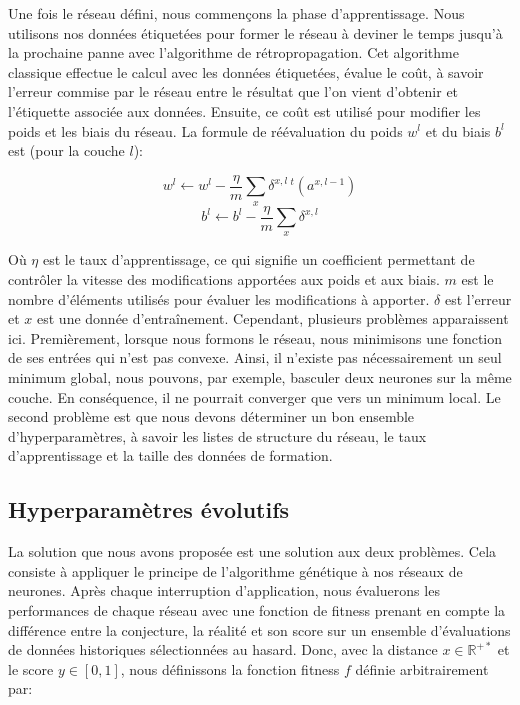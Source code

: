 \documentclass[10pt,a4paper,oneside]{article}
\begin{document}
\begin{multicols}{2}
Une fois le réseau défini, nous commençons la phase d’apprentissage. Nous utilisons nos données étiquetées pour former le réseau à deviner le temps jusqu'à la prochaine panne avec l'algorithme de rétropropagation. Cet algorithme classique effectue le calcul avec les données étiquetées, évalue le coût, à savoir l'erreur commise par le réseau entre le résultat que l'on vient d'obtenir et l'étiquette associée aux données. Ensuite, ce coût est utilisé pour modifier les poids et les biais du réseau. La formule de réévaluation du poids $w^l$ et du biais $b^l$ est (pour la couche $l$):

\vspace{0.8cm}

\begin{Large}
\[ w^l \leftarrow  w^l-\frac{\eta}{m} \sum_x \delta^{x,l} \,{}^t(a^{x,l-1}) \]
\[ b^l \leftarrow b^l-\frac{\eta}{m} \sum_x \delta^{x,l} \]
\end{Large}

\vspace{0.8cm}

Où $\eta$ est le taux d'apprentissage, ce qui signifie un coefficient permettant de contrôler la vitesse des modifications apportées aux poids et aux biais. $m$ est le nombre d'éléments utilisés pour évaluer les modifications à apporter. $\delta$ est l'erreur et $x$ est une donnée d'entraînement.
Cependant, plusieurs problèmes apparaissent ici. Premièrement, lorsque nous formons le réseau, nous minimisons une fonction de ses entrées qui n’est pas convexe. Ainsi, il n’existe pas nécessairement un seul minimum global, nous pouvons, par exemple, basculer deux neurones sur la même couche. En conséquence, il ne pourrait converger que vers un minimum local.
Le second problème est que nous devons déterminer un bon ensemble d’hyperparamètres, à savoir les listes de structure du réseau, le taux d’apprentissage et la taille des données de formation.

\subsection{Hyperparamètres évolutifs}
La solution que nous avons proposée est une solution aux deux problèmes. Cela consiste à appliquer le principe de l'algorithme génétique à nos réseaux de neurones. Après chaque interruption d’application, nous évaluerons les performances de chaque réseau avec une fonction de fitness prenant en compte la différence entre la conjecture, la réalité et son score sur un ensemble d’évaluations de données historiques sélectionnées au hasard. Donc, avec la distance $x\in\mathbb{R}^{+*}$ et le score $y\in[0, 1]$, nous définissons la fonction fitness $f$ définie arbitrairement par:


\end{multicols}
\end{document}
